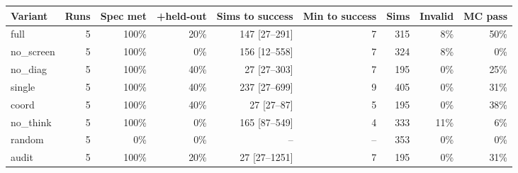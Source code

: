 \begin{tabular}{lrrrrrrrr}
\toprule
Variant & Runs & Spec met & +held-out & Sims to success & Min to success & Sims & Invalid & MC pass \\
\midrule
full & 5 & 100\% & 20\% & 147 [27--291] & 7 & 315 & 8\% & 50\% \\
no\_screen & 5 & 100\% & 0\% & 156 [12--558] & 7 & 324 & 8\% & 0\% \\
no\_diag & 5 & 100\% & 40\% & 27 [27--303] & 7 & 195 & 0\% & 25\% \\
single & 5 & 100\% & 40\% & 237 [27--699] & 9 & 405 & 0\% & 31\% \\
coord & 5 & 100\% & 40\% & 27 [27--87] & 5 & 195 & 0\% & 38\% \\
no\_think & 5 & 100\% & 0\% & 165 [87--549] & 4 & 333 & 11\% & 6\% \\
random & 5 & 0\% & 0\% & -- & -- & 353 & 0\% & 0\% \\
audit & 5 & 100\% & 20\% & 27 [27--1251] & 7 & 195 & 0\% & 31\% \\
\bottomrule
\end{tabular}

